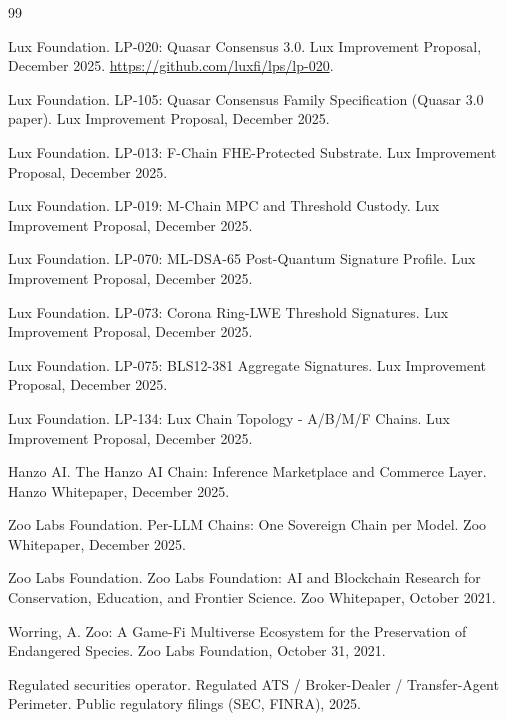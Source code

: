 \documentclass[11pt,letterpaper]{article}
\begin{document}
\begin{thebibliography}{99}

Lux Foundation.
\newblock LP-020: Quasar Consensus 3.0.
\newblock Lux Improvement Proposal, December 2025.
\newblock \url{https://github.com/luxfi/lps/lp-020}.

Lux Foundation.
\newblock LP-105: Quasar Consensus Family Specification (Quasar 3.0 paper).
\newblock Lux Improvement Proposal, December 2025.

Lux Foundation.
\newblock LP-013: F-Chain FHE-Protected Substrate.
\newblock Lux Improvement Proposal, December 2025.

Lux Foundation.
\newblock LP-019: M-Chain MPC and Threshold Custody.
\newblock Lux Improvement Proposal, December 2025.

Lux Foundation.
\newblock LP-070: ML-DSA-65 Post-Quantum Signature Profile.
\newblock Lux Improvement Proposal, December 2025.

Lux Foundation.
\newblock LP-073: Corona Ring-LWE Threshold Signatures.
\newblock Lux Improvement Proposal, December 2025.

Lux Foundation.
\newblock LP-075: BLS12-381 Aggregate Signatures.
\newblock Lux Improvement Proposal, December 2025.

Lux Foundation.
\newblock LP-134: Lux Chain Topology - A/B/M/F Chains.
\newblock Lux Improvement Proposal, December 2025.

Hanzo AI.
\newblock The Hanzo AI Chain: Inference Marketplace and Commerce Layer.
\newblock Hanzo Whitepaper, December 2025.

Zoo Labs Foundation.
\newblock Per-LLM Chains: One Sovereign Chain per Model.
\newblock Zoo Whitepaper, December 2025.

Zoo Labs Foundation.
\newblock Zoo Labs Foundation: AI and Blockchain Research for Conservation, Education, and Frontier Science.
\newblock Zoo Whitepaper, October 2021.

Worring, A.
\newblock Zoo: A Game-Fi Multiverse Ecosystem for the Preservation of Endangered Species.
\newblock Zoo Labs Foundation, October 31, 2021.

Regulated securities operator.
\newblock Regulated ATS / Broker-Dealer / Transfer-Agent Perimeter.
\newblock Public regulatory filings (SEC, FINRA), 2025.


\end{thebibliography}
\end{document}
